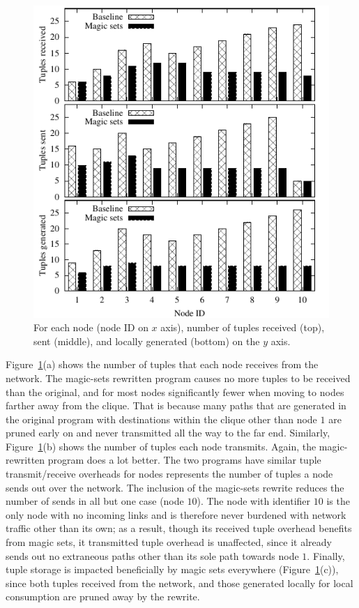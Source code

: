 {\begin{figure}
\centering
\includegraphics{figures/magicNumbers}
\ssp
\caption{For each node (node ID on $x$ axis), number of tuples received
  (top), sent (middle), and locally generated (bottom) on the $y$ axis.}
\label{ch:evita:fig:magicresults}
\end{figure}

Figure~\ref{ch:evita:fig:magicresults}(a) shows the number of tuples that each
node receives from the network.  The magic-sets rewritten program causes no
more tuples to be received than the original, and for most nodes significantly
fewer when moving to nodes farther away from the clique.  That is because many
paths that are generated in the original program with destinations within the
clique other than node $1$ are pruned early on and never transmitted all the
way to the far end.  Similarly, Figure~\ref{ch:evita:fig:magicresults}(b) shows
the number of tuples each node transmits.  Again, the magic-rewritten program
does a lot better.  The two programs have similar tuple transmit/receive
overheads for nodes represents the number of tuples a node sends out over the
network.  The inclusion of the magic-sets rewrite reduces the number of sends
in all but one case (node $10$).  The node with identifier $10$ is the only
node with no incoming links and is therefore never burdened with network
traffic other than its own; as a result, though its received tuple overhead
benefits from magic sets, it transmitted tuple overhead is unaffected, since it
already sends out no extraneous paths other than its sole path towards node
$1$.  Finally, tuple storage is impacted beneficially by magic sets everywhere
(Figure~\ref{ch:evita:fig:magicresults}(c)), since both  tuples
received from the network, and those generated locally for local consumption
are pruned away by the rewrite.



}
